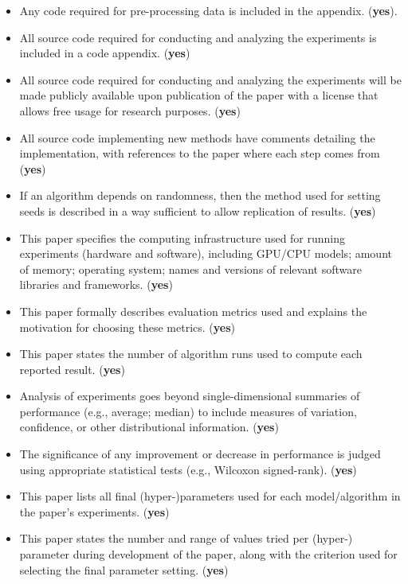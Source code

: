 \begin{itemize}
    \item Any code required for pre-processing data is included in the appendix. (\textbf{yes}).
    \item All source code required for conducting and analyzing the experiments is included in a code appendix. (\textbf{yes})
    \item All source code required for conducting and analyzing the experiments will be made publicly available upon publication of the paper with a license that allows free usage for research purposes. (\textbf{yes})
    \item All source code implementing new methods have comments detailing the implementation, with references to the paper where each step comes from (\textbf{yes})
    \item If an algorithm depends on randomness, then the method used for setting seeds is described in a way sufficient to allow replication of results. (\textbf{yes})
    \item This paper specifies the computing infrastructure used for running experiments (hardware and software), including GPU/CPU models; amount of memory; operating system; names and versions of relevant software libraries and frameworks. (\textbf{yes})
    \item This paper formally describes evaluation metrics used and explains the motivation for choosing these metrics. (\textbf{yes})
    \item This paper states the number of algorithm runs used to compute each reported result. (\textbf{yes})
    \item Analysis of experiments goes beyond single-dimensional summaries of performance (e.g., average; median) to include measures of variation, confidence, or other distributional information. (\textbf{yes})
    \item The significance of any improvement or decrease in performance is judged using appropriate statistical tests (e.g., Wilcoxon signed-rank). (\textbf{yes})
    \item This paper lists all final (hyper-)parameters used for each model/algorithm in the paper’s experiments. (\textbf{yes})
    \item This paper states the number and range of values tried per (hyper-) parameter during development of the paper, along with the criterion used for selecting the final parameter setting. (\textbf{yes})
\end{itemize}
\twocolumn
